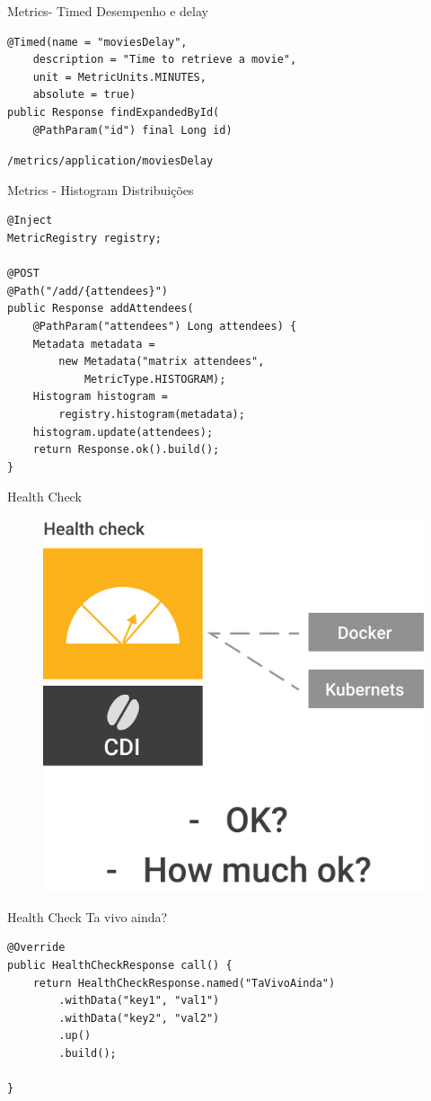 \documentclass{beamer}
\begin{document}
\begin{frame}[fragile]{Metrics- Timed}
Desempenho e delay
\begin{lstlisting}
@Timed(name = "moviesDelay",
	description = "Time to retrieve a movie",
	unit = MetricUnits.MINUTES,
	absolute = true)
public Response findExpandedById(
	@PathParam("id") final Long id) 
\end{lstlisting}

\lstinline|/metrics/application/moviesDelay|
\end{frame}

\begin{frame}[fragile]{Metrics - Histogram}
Distribuições 
\begin{lstlisting}
@Inject
MetricRegistry registry;

@POST
@Path("/add/{attendees}")
public Response addAttendees(
	@PathParam("attendees") Long attendees) {
	Metadata metadata =
		new Metadata("matrix attendees",
			MetricType.HISTOGRAM);
	Histogram histogram = 
		registry.histogram(metadata);
	histogram.update(attendees);
	return Response.ok().build();
}
\end{lstlisting}

\end{frame}

\begin{frame}{Health Check}
\begin{figure}
	\centering
	\includegraphics[width=0.75\linewidth]{Images/healthcheck}
\end{figure}
\end{frame}

\begin{frame}[fragile]{Health Check}
Ta vivo ainda?
\begin{lstlisting}
@Override
public HealthCheckResponse call() {
	return HealthCheckResponse.named("TaVivoAinda")
		.withData("key1", "val1")
		.withData("key2", "val2")
		.up()
		.build();

}
\end{lstlisting}

\end{frame}
\end{document}
